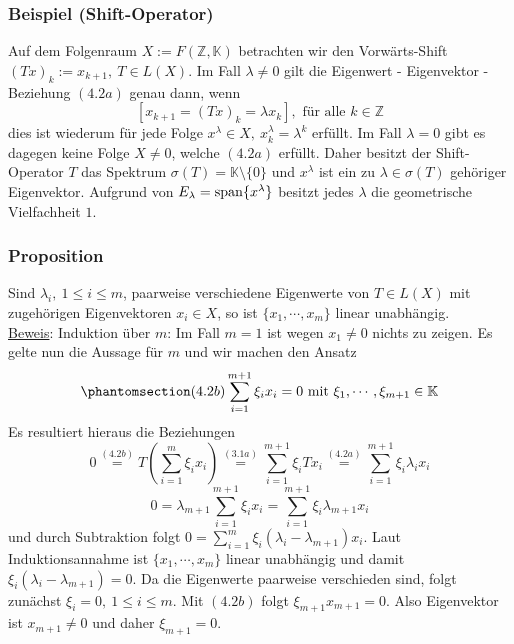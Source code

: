 \subsubsection{Beispiel (Shift-Operator)}
Auf dem Folgenraum $X:=F(\mathbb{Z},\mathbb{K})$ betrachten wir den Vorwärts-Shift $(Tx)_k :=x_{k+1},\ T\in L(X)$.  Im Fall $\lambda \not= 0$ gilt die Eigenwert - Eigenvektor - Beziehung \hyperref[4.2a]{$(4.2a)$} genau dann, wenn
\[[x_{k+1}=(Tx)_k=\lambda x_k],\text{ für alle } k\in\mathbb{Z}\]
dies ist wiederum für jede Folge $x^\lambda \in X,\ x_k^\lambda =\lambda ^k$ erfüllt.  Im Fall $\lambda = 0$ gibt es dagegen keine Folge $X\not= 0$, welche \hyperref[4.2a]{$(4.2a)$} erfüllt.  Daher besitzt der Shift-Operator $T$ das Spektrum $\sigma (T)=\mathbb{K}\setminus \{0\}$ und $x^\lambda$ ist ein zu $\lambda \in \sigma (T)$ gehöriger Eigenvektor.  Aufgrund von $E_\lambda =\operatorname{span}\{x^\lambda\}$ besitzt jedes $\lambda$ die geometrische Vielfachheit $1$.
\subsubsection{Proposition}
\label{4.2.5}
Sind $\lambda _i,\ 1\leq i\leq m$, paarweise verschiedene Eigenwerte von $T\in L(X)$ mit zugehörigen Eigenvektoren $x_i\in X$, so ist $\{x_1,\cdots ,x_m\}$ linear unabhängig.\\
\underline{Beweis}: Induktion über $m$: Im Fall $m=1$ ist wegen $x_1\not=0$ nichts zu zeigen.  Es gelte nun die Aussage für $m$ und wir machen den Ansatz 
\[\phantomsection\label{4.2b}(4.2b)\sum _{i=1}^{m+1}\xi _i x_i=0\text{ mit } \xi _1,\cdots ,\xi _{m+1}\in\mathbb{K}\]
Es resultiert hieraus die Beziehungen
\[0\stackrel{\hyperref[4.2b]{(4.2b)}}{=}T(\sum _{i=1}^m \xi _i x_i)\stackrel{\hyperref[3.1a]{(3.1a)}}{=}\sum _{i=1}^{m+1}\xi _i Tx_i\stackrel{\hyperref[4.2a]{(4.2a)}}{=}\sum _{i=1}^{m+1}\xi _i\lambda _i x_i\]
\[0=\lambda _{m+1}\sum _{i=1}^{m+1}\xi _i x_i = \sum _{i=1}^{m+1} \xi _i \lambda _{m+1} x_i\]
und durch Subtraktion folgt $0=\sum _{i=1}^m \xi _i (\lambda _i-\lambda _{m+1}) x_i$.  Laut Induktionsannahme ist $\{x_1,\cdots ,x_m\}$ linear unabhängig und damit $\xi _i (\lambda _i -\lambda _{m+1})=0$.  Da die Eigenwerte paarweise verschieden sind, folgt zunächst $\xi _i=0,\ 1\leq i\leq m$.  Mit \hyperref[4.2b]{$(4.2b)$} folgt $\xi _{m+1} x_{m+1}=0$.  Also Eigenvektor ist $x_{m+1}\not=0$ und daher $\xi _{m+1}=0$.
